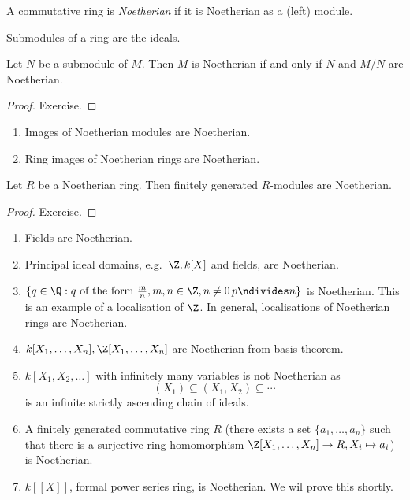 \documentclass[a4paper]{article}
\begin{document}
\begin{definition}
  A commutative ring is \emph{Noetherian} if it is Noetherian as a (left) module.
\end{definition}

\begin{remark}
  Submodules of a ring are the ideals.
\end{remark}

\begin{lemma}
  Let \(N\) be a submodule of \(M\). Then \(M\) is Noetherian if and only if \(N\) and \(M/N\) are Noetherian.
\end{lemma}

\begin{proof}
  Exercise.
\end{proof}

\begin{remark}\leavevmode
  \begin{enumerate}
  \item Images of Noetherian modules are Noetherian.
  \item Ring images of Noetherian rings are Noetherian.
  \end{enumerate}
\end{remark}

\begin{lemma}
  Let \(R\) be a Noetherian ring. Then finitely generated \(R\)-modules are Noetherian.
\end{lemma}

\begin{proof}
  Exercise.
\end{proof}

\begin{eg}\leavevmode
  \begin{enumerate}
  \item Fields are Noetherian.
  \item Principal ideal domains, e.g.\ \(\Z, k[X]\) and fields, are Noetherian.
  \item \(\{q \in \Q: q \text{ of the form } \frac{m}{n}, m, n \in \Z, n \neq 0\, p \ndivides n\}\) is Noetherian. This is an example of a localisation of \(\Z\). In general, localisations of Noetherian rings are Noetherian.
  \item \(k[X_1, \dots, X_n], \Z[X_1, \dots, X_n]\) are Noetherian from basis theorem.
  \item \(k[X_1, X_2, \dots]\) with infinitely many variables is not Noetherian as
    \[
      (X_1) \subseteq (X_1, X_2) \subseteq \cdots
    \]
    is an infinite strictly ascending chain of ideals.
  \item A finitely generated commutative ring \(R\) (there exists a set \(\{a_1, \dots, a_n\}\) such that there is a surjective ring homomorphism \(\Z[X_1, \dots, X_n] \to R, X_i \mapsto a_i\)) is Noetherian.
  \item \(k[[X]]\), formal power series ring, is Noetherian. We wil prove this shortly.
  \end{enumerate}
\end{eg}
\end{document}
